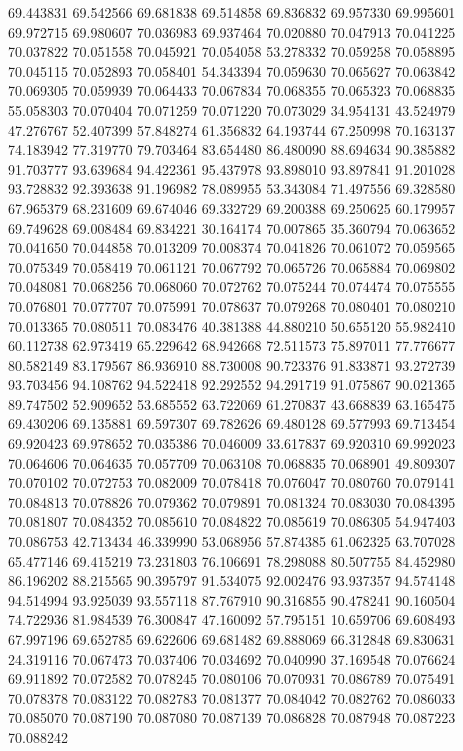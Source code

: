 69.443831
69.542566
69.681838
69.514858
69.836832
69.957330
69.995601
69.972715
69.980607
70.036983
69.937464
70.020880
70.047913
70.041225
70.037822
70.051558
70.045921
70.054058
53.278332
70.059258
70.058895
70.045115
70.052893
70.058401
54.343394
70.059630
70.065627
70.063842
70.069305
70.059939
70.064433
70.067834
70.068355
70.065323
70.068835
55.058303
70.070404
70.071259
70.071220
70.073029
34.954131
43.524979
47.276767
52.407399
57.848274
61.356832
64.193744
67.250998
70.163137
74.183942
77.319770
79.703464
83.654480
86.480090
88.694634
90.385882
91.703777
93.639684
94.422361
95.437978
93.898010
93.897841
91.201028
93.728832
92.393638
91.196982
78.089955
53.343084
71.497556
69.328580
67.965379
68.231609
69.674046
69.332729
69.200388
69.250625
60.179957
69.749628
69.008484
69.834221
30.164174
70.007865
35.360794
70.063652
70.041650
70.044858
70.013209
70.008374
70.041826
70.061072
70.059565
70.075349
70.058419
70.061121
70.067792
70.065726
70.065884
70.069802
70.048081
70.068256
70.068060
70.072762
70.075244
70.074474
70.075555
70.076801
70.077707
70.075991
70.078637
70.079268
70.080401
70.080210
70.013365
70.080511
70.083476
40.381388
44.880210
50.655120
55.982410
60.112738
62.973419
65.229642
68.942668
72.511573
75.897011
77.776677
80.582149
83.179567
86.936910
88.730008
90.723376
91.833871
93.272739
93.703456
94.108762
94.522418
92.292552
94.291719
91.075867
90.021365
89.747502
52.909652
53.685552
63.722069
61.270837
43.668839
63.165475
69.430206
69.135881
69.597307
69.782626
69.480128
69.577993
69.713454
69.920423
69.978652
70.035386
70.046009
33.617837
69.920310
69.992023
70.064606
70.064635
70.057709
70.063108
70.068835
70.068901
49.809307
70.070102
70.072753
70.082009
70.078418
70.076047
70.080760
70.079141
70.084813
70.078826
70.079362
70.079891
70.081324
70.083030
70.084395
70.081807
70.084352
70.085610
70.084822
70.085619
70.086305
54.947403
70.086753
42.713434
46.339990
53.068956
57.874385
61.062325
63.707028
65.477146
69.415219
73.231803
76.106691
78.298088
80.507755
84.452980
86.196202
88.215565
90.395797
91.534075
92.002476
93.937357
94.574148
94.514994
93.925039
93.557118
87.767910
90.316855
90.478241
90.160504
74.722936
81.984539
76.300847
47.160092
57.795151
10.659706
69.608493
67.997196
69.652785
69.622606
69.681482
69.888069
66.312848
69.830631
24.319116
70.067473
70.037406
70.034692
70.040990
37.169548
70.076624
69.911892
70.072582
70.078245
70.080106
70.070931
70.086789
70.075491
70.078378
70.083122
70.082783
70.081377
70.084042
70.082762
70.086033
70.085070
70.087190
70.087080
70.087139
70.086828
70.087948
70.087223
70.088242
